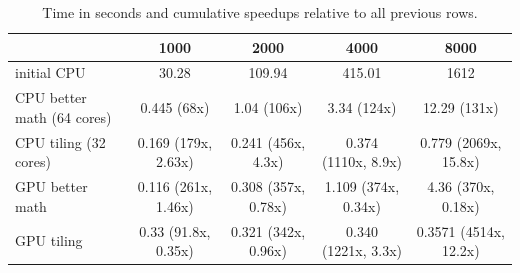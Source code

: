 \begin{table}[H]
    \centering
    \begin{tabular}{|l|c|c|c|c|}
        \hline
                                   & \textbf{1000}       & \textbf{2000}       & \textbf{4000}       & \textbf{8000}         \\
        \hline
        initial CPU                & 30.28               & 109.94              & 415.01              & 1612                  \\

        CPU better math (64 cores) & 0.445 (68x)         & 1.04 (106x)         & 3.34 (124x)         & 12.29 (131x)          \\

        CPU tiling (32 cores)      & 0.169 (179x, 2.63x) & 0.241 (456x, 4.3x)  & 0.374 (1110x, 8.9x) & 0.779 (2069x, 15.8x)  \\

        GPU better math            & 0.116 (261x, 1.46x) & 0.308 (357x, 0.78x) & 1.109 (374x, 0.34x) & 4.36 (370x, 0.18x)    \\

        GPU tiling                 & 0.33 (91.8x, 0.35x) & 0.321 (342x, 0.96x) & 0.340 (1221x, 3.3x) & 0.3571 (4514x, 12.2x) \\

        \hline
    \end{tabular}
    \caption{Time in seconds and cumulative speedups relative to all previous rows.}
    \label{tab:cpu-timings}
\end{table}

